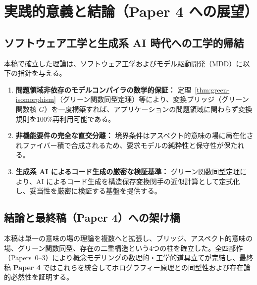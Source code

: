 \documentclass[11pt,a4paper]{ltjsarticle}
\theoremstyle{definition}
\theoremstyle{plain}
\theoremstyle{remark}
\begin{document}
\section{実践的意義と結論（Paper 4 への展望）}

\subsection{ソフトウェア工学と生成系 AI 時代への工学的帰結}
本稿で確立した理論は、ソフトウェア工学およびモデル駆動開発（MDD）に以下の指針を与える。
\begin{enumerate}
    \item \textbf{問題領域非依存のモデルコンパイラの数学的保証：} 定理~\ref{thm:green-isomorphism}（グリーン関数同型定理）等により、変換ブリッジ（グリーン関数核 $G$）を一度構築すれば、アプリケーションの問題領域に関わらず変換規則を100\%再利用可能である。
    \item \textbf{非機能要件の完全な直交分離：} 境界条件はアスペクト的意味の場に局在化されファイバー積で合成されるため、要求モデルの純粋性と保守性が保たれる。
    \item \textbf{生成系 AI によるコード生成の厳密な検証基準：} グリーン関数同型定理により、AI によるコード生成を構造保存変換関手の近似計算として定式化し、妥当性を厳密に検証する基盤を提供する。
\end{enumerate}

\subsection{結論と最終稿（Paper 4）への架け橋}
本稿は単一の意味の場の理論を複数へと拡張し、ブリッジ、アスペクト的意味の場、グリーン関数同型、存在の二重構造という4つの柱を確立した。全四部作（Papers~0--3）により概念モデリングの数理的・工学的道具立てが完結し、最終稿 \textbf{Paper 4} ではこれらを統合してホログラフィー原理との同型性および存在論的必然性を証明する。
\end{document}

